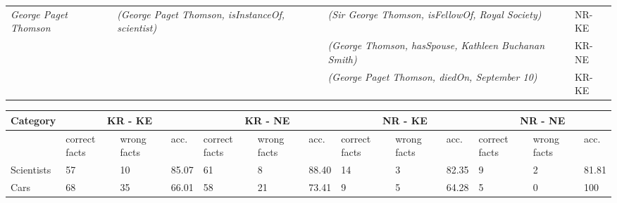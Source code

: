 \begin{table*}[!htb]
\begin{small}
\begin{tabular}{|p{2.3cm}|p{4.6cm}|p{5.5cm}|p{2cm}|}
\textit{George Paget Thomson} & \textit{(George Paget Thomson, isInstanceOf, scientist)} & \textit{(Sir George Thomson, isFellowOf, Royal Society)} & NR-KE \\
{} & {} & \textit{(George Thomson, hasSpouse, Kathleen Buchanan Smith)} & KR-NE \\
{} & {} & \textit{(George Paget Thomson, diedOn,  September 10)} & KR-KE\\
\hline
\end{tabular}
\caption{\label{table:mapping}Facts corresponding to an entity from the \textit{scientists} domain in NELL as well as those extracted by \system{}. While NELL contained only one fact for this entity, \system{} was able to extract 15 facts for this entity, only 3 of which are shown above.}
%
\begin{tabular}{|p{1.5cm}|p{0.8cm}|p{0.8cm}|p{0.65cm}|p{0.8cm}|p{0.8cm}|p{0.65cm}|p{0.8cm}|p{0.8cm}|p{0.65cm}|p{0.8cm}|p{0.8cm}|p{0.65cm}|}
\hline
\textbf{Category} & \multicolumn{3}{c|}{\textbf{KR - KE}} & \multicolumn{3}{c|}{\textbf{KR - NE}}  & \multicolumn{3}{c|}{\textbf{NR - KE}} & \multicolumn{3}{c|}{\textbf{NR - NE}} \\
\hline
 {} & correct facts & wrong facts  & acc. & correct facts & wrong facts & acc. & correct facts & wrong facts & acc. & correct facts & wrong facts & acc.\\
\hline
Scientists & 57 & 10 & 85.07 & 61& 8 & 88.40 & 14 & 3 & 82.35 & 9 & 2 & 81.81 \\
\hline
Cars & 68 & 35 & 66.01 & 58 & 21 & 73.41 & 9 & 5 & 64.28 & 5 & 0 & 100 \\

\end{tabular}
\end{small}
\end{table*}

